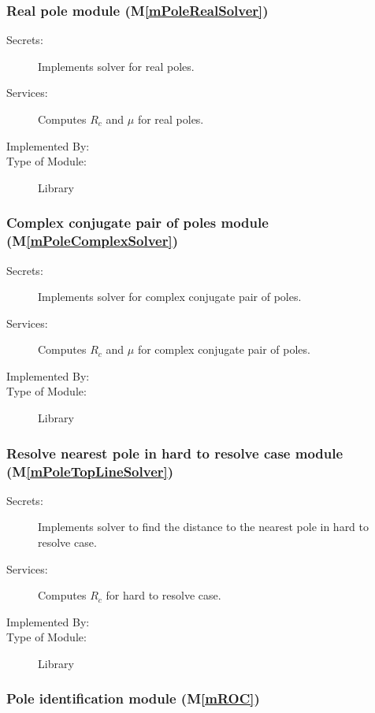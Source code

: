 \documentclass[12pt, titlepage]{article}
\newcommand{\mref}[1]{M\ref{#1}}
\begin{document}
\subsubsection{Real pole module (\mref{mPoleRealSolver})}

\begin{description}
\item[Secrets:] Implements solver for real poles.
\item[Services:] Computes $R_c$ and $\mu$ for real poles.
\item[Implemented By:] 
\item[Type of Module:] Library
\end{description}

\subsubsection{Complex conjugate pair of poles module (\mref{mPoleComplexSolver})}

\begin{description}
\item[Secrets:] Implements solver for complex conjugate pair of poles.
\item[Services:] Computes $R_c$ and $\mu$ for complex conjugate pair of poles.
\item[Implemented By:] 
\item[Type of Module:] Library
\end{description}

\subsubsection{Resolve nearest pole in hard to resolve case module (\mref{mPoleTopLineSolver})}

\begin{description}
\item[Secrets:] Implements solver to find the distance to the nearest pole in hard to resolve case.
\item[Services:] Computes $R_c$ for hard to resolve case.
\item[Implemented By:] 
\item[Type of Module:] Library
\end{description}

\subsubsection{Pole identification module (\mref{mROC})}
\end{document}
